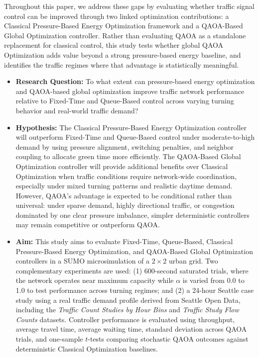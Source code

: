 \documentclass[12pt]{article}
\begin{document}
Throughout this paper, we address these gaps by evaluating whether traffic signal control can be improved through two linked optimization contributions: a Classical Pressure-Based Energy Optimization framework and a QAOA-Based Global Optimization controller. Rather than evaluating QAOA as a standalone replacement for classical control, this study tests whether global QAOA Optimization adds value beyond a strong pressure-based energy baseline, and identifies the traffic regimes where that advantage is statistically meaningful.

\begin{itemize}
\item \textbf{Research Question:} To what extent can pressure-based energy optimization and QAOA-based global optimization improve traffic network performance relative to Fixed-Time and Queue-Based control across varying turning behavior and real-world traffic demand?

\item \textbf{Hypothesis:} The Classical Pressure-Based Energy Optimization controller will outperform Fixed-Time and Queue-Based control under moderate-to-high demand by using pressure alignment, switching penalties, and neighbor coupling to allocate green time more efficiently. The QAOA-Based Global Optimization controller will provide additional benefits over Classical Optimization when traffic conditions require network-wide coordination, especially under mixed turning patterns and realistic daytime demand. However, QAOA's advantage is expected to be conditional rather than universal: under sparse demand, highly directional traffic, or congestion dominated by one clear pressure imbalance, simpler deterministic controllers may remain competitive or outperform QAOA.

\item \textbf{Aim:} This study aims to evaluate Fixed-Time, Queue-Based, Classical Pressure-Based Energy Optimization, and QAOA-Based Global Optimization controllers in a SUMO microsimulation of a $2 \times 2$ urban grid. Two complementary experiments are used: (1) 600-second saturated trials, where the network operates near maximum capacity while $\alpha$ is varied from 0.0 to 1.0 to test performance across turning regimes; and (2) a 24-hour Seattle case study using a real traffic demand profile derived from Seattle Open Data, including the \emph{Traffic Count Studies by Hour Bins} and \emph{Traffic Study Flow Counts} datasets. Controller performance is evaluated using throughput, average travel time, average waiting time, standard deviation across QAOA trials, and one-sample $t$-tests comparing stochastic QAOA outcomes against deterministic Classical Optimization baselines.
\end{itemize}
\end{document}
